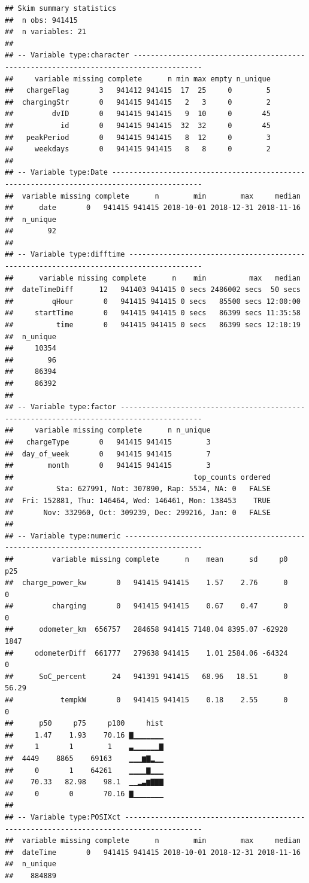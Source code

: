 \documentclass[]{article}
\begin{document}
\begin{verbatim}
## Skim summary statistics
##  n obs: 941415 
##  n variables: 21 
## 
## -- Variable type:character --------------------------------------------------------------------------------------
##     variable missing complete      n min max empty n_unique
##   chargeFlag       3   941412 941415  17  25     0        5
##  chargingStr       0   941415 941415   2   3     0        2
##         dvID       0   941415 941415   9  10     0       45
##           id       0   941415 941415  32  32     0       45
##   peakPeriod       0   941415 941415   8  12     0        3
##     weekdays       0   941415 941415   8   8     0        2
## 
## -- Variable type:Date -------------------------------------------------------------------------------------------
##  variable missing complete      n        min        max     median
##      date       0   941415 941415 2018-10-01 2018-12-31 2018-11-16
##  n_unique
##        92
## 
## -- Variable type:difftime ---------------------------------------------------------------------------------------
##      variable missing complete      n    min          max   median
##  dateTimeDiff      12   941403 941415 0 secs 2486002 secs  50 secs
##         qHour       0   941415 941415 0 secs   85500 secs 12:00:00
##     startTime       0   941415 941415 0 secs   86399 secs 11:35:58
##          time       0   941415 941415 0 secs   86399 secs 12:10:19
##  n_unique
##     10354
##        96
##     86394
##     86392
## 
## -- Variable type:factor -----------------------------------------------------------------------------------------
##     variable missing complete      n n_unique
##   chargeType       0   941415 941415        3
##  day_of_week       0   941415 941415        7
##        month       0   941415 941415        3
##                                          top_counts ordered
##          Sta: 627991, Not: 307890, Rap: 5534, NA: 0   FALSE
##  Fri: 152881, Thu: 146464, Wed: 146461, Mon: 138453    TRUE
##       Nov: 332960, Oct: 309239, Dec: 299216, Jan: 0   FALSE
## 
## -- Variable type:numeric ----------------------------------------------------------------------------------------
##         variable missing complete      n    mean      sd     p0     p25
##  charge_power_kw       0   941415 941415    1.57    2.76      0    0   
##         charging       0   941415 941415    0.67    0.47      0    0   
##      odometer_km  656757   284658 941415 7148.04 8395.07 -62920 1847   
##     odometerDiff  661777   279638 941415    1.01 2584.06 -64324    0   
##      SoC_percent      24   941391 941415   68.96   18.51      0   56.29
##           tempkW       0   941415 941415    0.18    2.55      0    0   
##      p50     p75     p100     hist
##     1.47    1.93    70.16 ▇▁▁▁▁▁▁▁
##     1       1        1    ▃▁▁▁▁▁▁▇
##  4449    8865    69163    ▁▁▁▆▇▂▁▁
##     0       1    64261    ▁▁▁▁▇▁▁▁
##    70.33   82.98    98.1  ▁▁▂▃▆▇▇▇
##     0       0       70.16 ▇▁▁▁▁▁▁▁
## 
## -- Variable type:POSIXct ----------------------------------------------------------------------------------------
##  variable missing complete      n        min        max     median
##  dateTime       0   941415 941415 2018-10-01 2018-12-31 2018-11-16
##  n_unique
##    884889
\end{verbatim}
\end{document}
